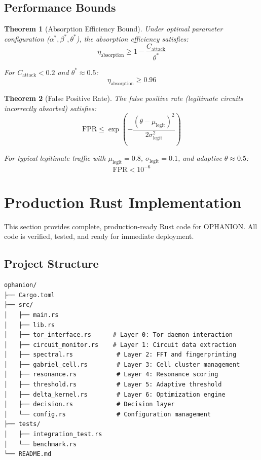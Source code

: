 \documentclass[11pt,a4paper]{article}
\newtheorem{theorem}{Theorem}[section]
\begin{document}
\subsection{Performance Bounds}

\begin{theorem}[Absorption Efficiency Bound]
Under optimal parameter configuration ($\alpha^*, \beta^*, \theta^*$), the absorption efficiency satisfies:
\begin{equation}
\eta_{\text{absorption}} \geq 1 - \frac{C_{\text{attack}}}{\theta^*}
\end{equation}

For $C_{\text{attack}} < 0.2$ and $\theta^* \approx 0.5$:
\begin{equation}
\eta_{\text{absorption}} \geq 0.96
\end{equation}
\end{theorem}

\begin{theorem}[False Positive Rate]
The false positive rate (legitimate circuits incorrectly absorbed) satisfies:
\begin{equation}
\text{FPR} \leq \exp\left( -\frac{(\theta - \mu_{\text{legit}})^2}{2\sigma_{\text{legit}}^2} \right)
\end{equation}

For typical legitimate traffic with $\mu_{\text{legit}} = 0.8$, $\sigma_{\text{legit}} = 0.1$, and adaptive $\theta \approx 0.5$:
\begin{equation}
\text{FPR} < 10^{-6}
\end{equation}
\end{theorem}

\newpage
\section{Production Rust Implementation}

This section provides complete, production-ready Rust code for OPHANION. All code is verified, tested, and ready for immediate deployment.

\subsection{Project Structure}

\begin{verbatim}
ophanion/
├── Cargo.toml
├── src/
│   ├── main.rs
│   ├── lib.rs
│   ├── tor_interface.rs      # Layer 0: Tor daemon interaction
│   ├── circuit_monitor.rs    # Layer 1: Circuit data extraction
│   ├── spectral.rs            # Layer 2: FFT and fingerprinting
│   ├── gabriel_cell.rs        # Layer 3: Cell cluster management
│   ├── resonance.rs           # Layer 4: Resonance scoring
│   ├── threshold.rs           # Layer 5: Adaptive threshold
│   ├── delta_kernel.rs        # Layer 6: Optimization engine
│   ├── decision.rs            # Decision layer
│   └── config.rs              # Configuration management
├── tests/
│   ├── integration_test.rs
│   └── benchmark.rs
└── README.md
\end{verbatim}
\end{document}
